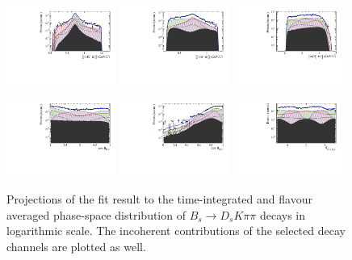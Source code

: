 \begin{figure}[h]
		\includegraphics[width=0.32\textwidth, height = !]{figs/lassoFit/LASSO/m_Kpi_mod_log.pdf} 
		\includegraphics[width=0.32\textwidth, height = !]{figs/lassoFit/LASSO/m_pipi_mod_log.pdf} 
		\includegraphics[width=0.32\textwidth, height = !]{figs/lassoFit/LASSO/m_Dspi_mod_log.pdf} 
		
		\includegraphics[width=0.32\textwidth, height = !]{figs/lassoFit/LASSO/h_cosTheta_Kpi_mod_log.pdf} 
		\includegraphics[width=0.32\textwidth, height = !]{figs/lassoFit/LASSO/h_cosTheta_Dspi_mod_log.pdf} 
		\includegraphics[width=0.32\textwidth, height = !]{figs/lassoFit/LASSO/h_phi_Kpi_Dspi_mod_log.pdf} 

		\caption{\small Projections of the fit result to the time-integrated and flavour averaged phase-space distribution of $B_s \to D_s K \pi \pi$  decays in logarithmic scale.
		The incoherent contributions of the selected decay channels are plotted as well. } 		
		\label{fig:lassoFit2}
\end{figure}

